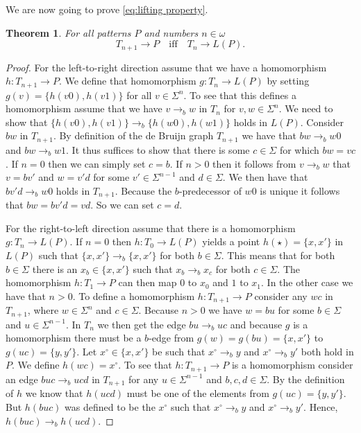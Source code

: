 \documentclass[a4paper]{article}
\renewcommand{\iff}{\quad \mbox{iff} \quad}
\newtheorem{theorem}{Theorem}
\begin{document}
We are now going to prove \eqref{eq:lifting property}.
\begin{theorem}
 For all patterns $P$ and numbers $n \in \omega$
\begin{equation*}
 T_{n + 1} \to P \iff T_n \to L(P).
\end{equation*}
\end{theorem}
\begin{proof}
 For the left-to-right direction assume that we have a homomorphism $h :
T_{n + 1} \to P$. We define that homomorphism $g : T_n \to L(P)$ by
setting $g(v) = \{h(v0),h(v1)\}$ for all $v \in \Sigma^n$. To see that
this defines a homomorphism assume that we have $v \rightarrow_b w$ in
$T_n$ for $v,w \in \Sigma^n$. We need to show that $\{h(v0),h(v1)\}
\rightarrow_b \{h(w0),h(w1)\}$ holds in $L(P)$. Consider $bw$ in $T_{n +
1}$. By definition of the de Bruijn graph $T_{n + 1}$ we have that $bw
\rightarrow_b w0$ and $bw \rightarrow_b w1$. It thus suffices to show
that there is some $c \in \Sigma$ for which $bw = vc$. If $n = 0$ then
we can simply set $c = b$. If $n > 0$ then it follows from $v
\rightarrow_b w$ that $v = b v'$ and $w = v' d$ for some $v' \in
\Sigma^{n - 1}$ and $d \in \Sigma$. We then have that $b v' d
\rightarrow_b w 0$ holds in $T_{n + 1}$. Because the $b$-predecessor of
$w 0$ is unique it follows that $b w = b v' d = v d$. So we can set $c =
d$.

 For the right-to-left direction assume that there is a homomorphism $g
: T_n \to L(P)$. If $n = 0$ then $h : T_0 \rightarrow L(P)$ yields a
point $h(\star) = \{x,x'\}$ in $L(P)$ such that $\{x,x'\} \rightarrow_b
\{x,x'\}$ for both $b \in \Sigma$. This means that for both $b \in
\Sigma$ there is an $x_b \in \{x,x'\}$ such that $x_b \rightarrow_b x_c$
for both $c \in \Sigma$. The homomorphism $h : T_1 \to P$ can then map
$0$ to $x_0$ and $1$ to $x_1$. In the other case we have that $n > 0$.
To define a homomorphism $h : T_{n + 1} \to P$ consider any $w c$ in
$T_{n + 1}$, where $w \in \Sigma^n$ and $c \in \Sigma$. Because $n > 0$
we have $w = b u$ for some $b \in \Sigma$ and $u \in \Sigma^{n - 1}$. In
$T_n$ we then get the edge $b u \rightarrow_b u c$ and because $g$ is a
homomorphism there must be a $b$-edge from $g(w) = g(bu) = \{x,x'\}$ to
$g(uc) = \{y,y'\}$. Let $x^\circ \in \{x,x'\}$ be such that $x^\circ
\rightarrow_b y$ and $x^\circ \rightarrow_b y'$ both hold in $P$. We
define $h(wc) = x^\circ$. To see that $h : T_{n + 1} \to P$ is a
homomorphism consider an edge $b u c \rightarrow_b u c d$ in $T_{n + 1}$
for any $u \in \Sigma^{n - 1}$ and $b,c,d \in \Sigma$. By the definition
of $h$ we know that $h(u c d)$ must be one of the elements from $g(u c)
= \{y,y'\}$. But $h(b u c)$ was defined to be the $x^\circ$ such that
$x^\circ \rightarrow_b y$ and $x^\circ \rightarrow_b y'$. Hence, $h(b u
c) \rightarrow_b h(u c d)$.
\end{proof}
\end{document}
